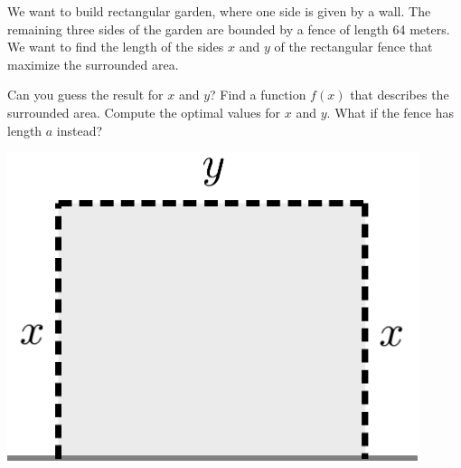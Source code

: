 \begin{exercise}
	We want to build rectangular garden, where one side is given by a wall.
	The remaining three sides of the garden are bounded by a fence of length 64 meters.
	We want to find the length of the sides $x$ and $y$ of the rectangular fence that
	maximize the surrounded area.\\
\begin{minipage}{0.66\textwidth}
	\begin{tasks}
		\task Can you guess the result for $x$ and $y$?
		\task Find a function $f(x)$ that describes the surrounded area.
		\task Compute the optimal values for $x$ and $y$.
		\task What if the fence has length $a$ instead?
	\end{tasks}
\end{minipage}\hfill
\begin{minipage}{0.33\textwidth}
	\includegraphics[width=0.9\textwidth]{images/fence}
\end{minipage}
\end{exercise}
